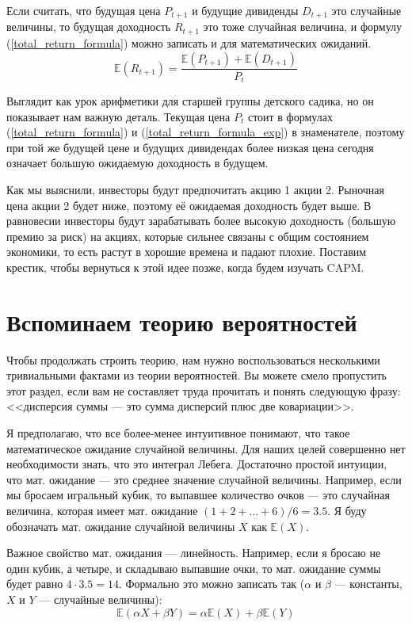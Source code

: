 Если считать, что будущая цена $P_{t+1}$ и будущие дивиденды $D_{t+1}$ это случайные величины, то будущая доходность $R_{t+1}$ это тоже случайная величина, и формулу (\ref{total_return_formula}) можно записать и для математических ожиданий.
\begin{equation}
\mathbb{E}(R_{t+1}) = \dfrac{\mathbb{E}(P_{t+1}) + \mathbb{E}(D_{t+1})}{P_t}
\label{total_return_formula_exp}
\end{equation}

Выглядит как урок арифметики для старшей группы детского садика, но он показывает нам важную деталь. Текущая цена $P_t$ стоит в формулах (\ref{total_return_formula}) и (\ref{total_return_formula_exp}) в знаменателе, поэтому при той же будущей цене и будущих дивидендах более низкая цена сегодня означает большую ожидаемую доходность в будущем.

Как мы выяснили, инвесторы будут предпочитать акцию 1 акции 2. Рыночная цена акции 2 будет ниже, поэтому её ожидаемая доходность будет выше. В равновесии инвесторы будут зарабатывать более высокую доходность (большую премию за риск) на акциях, которые сильнее связаны с общим состоянием экономики, то есть растут в хорошие времена и падают плохие. Поставим крестик, чтобы вернуться к этой идее позже, когда будем изучать CAPM.

\section{Вспоминаем теорию вероятностей}

Чтобы продолжать строить теорию, нам нужно воспользоваться несколькими тривиальными фактами из теории вероятностей. Вы можете смело пропустить этот раздел, если вам не составляет труда прочитать и понять следующую фразу: <<дисперсия суммы --- это сумма дисперсий плюс две ковариации>>.

Я предполагаю, что все более-менее интуитивное понимают, что такое математическое ожидание случайной величины. Для наших целей совершенно нет необходимости знать, что это интеграл Лебега. Достаточно простой интуиции, что мат. ожидание --- это среднее значение случайной величины. Например, если мы бросаем игральный кубик, то выпавшее количество очков --- это случайная величина, которая имеет мат. ожидание $(1+2+...+6)/6=3.5$. Я буду обозначать мат. ожидание случайной величины $X$ как $\mathbb{E}(X)$.

Важное свойство мат. ожидания --- линейность. Например, если я бросаю не один кубик, а четыре, и складываю выпавшие очки, то мат. ожидание суммы будет равно $4 \cdot 3.5 =  14$. Формально это можно записать так ($\alpha$ и $\beta$ --- константы, $X$ и $Y$ --- случайные величины):
\begin{equation*}
\mathbb{E}(\alpha X + \beta Y) = \alpha\mathbb{E}(X) + \beta\mathbb{E}(Y)
\end{equation*}

